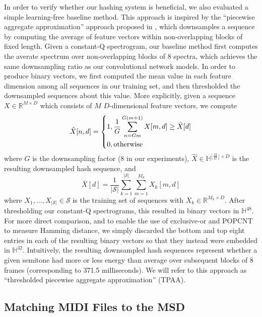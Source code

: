 In order to verify whether our hashing system is beneficial, we also evaluated a simple learning-free baseline method.
This approach is inspired by the ``piecewise aggregate approximation'' approach proposed in \cite{keogh2001dimensionality,yi2000fast}, which downsamples a sequence by computing the average of feature vectors within non-overlapping blocks of fixed length.
Given a constant-Q spectrogram, our baseline method first computes the averate spectrum over non-overlapping blocks of 8 spectra, which achieves the same downsampling ratio as our convolutional network models.
In order to produce binary vectors, we first computed the mean value in each feature dimension among all sequences in our training set, and then thresholded the downsampled sequences about this value.
More explicitly, given a sequence $X \in \mathbb{R}^{M \times D}$ which consists of $M$ $D$-dimensional feature vectors, we compute
\begin{equation}
\hat{X}[n, d] = \begin{dcases}
1, \frac{1}{G} \sum_{n = Gm}^{G(m + 1)} X[m, d] \ge \bar{X}[d]\\
0, \mathrm{otherwise}
\end{dcases}
\end{equation}
where $G$ is the downsampling factor ($8$ in our experiments), $\hat{X} \in \mathbb{H}^{\lfloor \frac{M}{G} \rfloor \times D}$ is the resulting downsampled hash sequence, and
\begin{equation}
\bar{X}[d] = \frac{1}{|\mathcal{S}|} \sum_{k = 1}^{|\mathcal{S}|} \sum_{m = 1}^{M_k} X_k[m, d]
\end{equation}
where $X_1, \ldots, X_{|\mathcal{S}|} \in \mathcal{S}$ is the training set of sequences with $X_k \in \mathbb{R}^{M_k \times D}$.
After thresholding our constant-Q spectrograms, this resulted in binary vectors in $\mathbb{H}^{48}$.
For more direct comparison, and to enable the use of exclusive-or and POPCNT to measure Hamming distance, we simply discarded the bottom and top eight entries in each of the resulting binary vectors so that they instead were embedded in $\mathbb{H}^{32}$.
Intuitively, the resulting downsampled hash sequences represent whether a given semitone had more or less energy than average over subsequent blocks of 8 frames (corresponding to 371.5 milliseconds).
We will refer to this approach as ``thresholded piecewise aggregate approximation'' (TPAA).

\subsection{Matching MIDI Files to the MSD}
\label{sec:matching_process}

